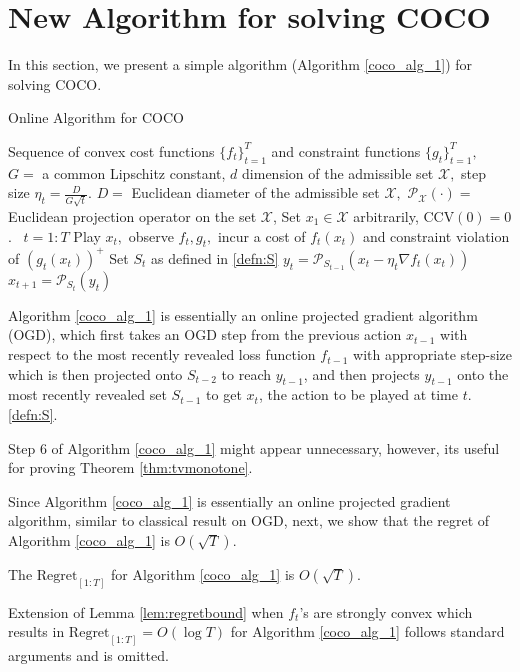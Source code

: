 \section{New Algorithm for solving COCO}
In this section, we present a simple algorithm (Algorithm \ref{coco_alg_1}) for solving COCO.
\begin{algorithm}[tb]
   \caption{Online Algorithm for COCO}
   \label{coco_alg_1}
\begin{algorithmic}[1]
    Sequence of convex cost functions $\{f_t\}_{t=1}^T$ and constraint functions $\{g_t\}_{t=1}^T,$ $G=$ a common Lipschitz constant,  $d$ dimension  of the admissible set $\mathcal{X},$ step size $\eta_t = \frac{D}{G \sqrt{t}}$. 
    $D=$ Euclidean diameter of the admissible set $\mathcal{X},$ $\mathcal{P}_\mathcal{X}(\cdot)=$ Euclidean projection operator on the set $\mathcal{X}$,       Set $ x_1 \in \mathcal{X}$ arbitrarily, $\text{CCV}(0)=0$.
    \ {$t=1:T$}
   \State \quad Play $x_t,$ observe $f_t, g_t,$ incur a cost of $f_t(x_t)$ and constraint violation of $(g_t(x_t))^+$
   \State \quad Set $S_t$ as defined in \eqref{defn:S}
    \State \quad $y_{t} =  \mathcal{P}_{S_{t-1}}\left(x_t - \eta_t \nabla f_t(x_t)\right)$
   \State \quad $x_{t+1} =  \mathcal{P}_{S_t}\left(y_t\right)$
\end{algorithmic}
\end{algorithm}
Algorithm \ref{coco_alg_1} is essentially an online projected gradient algorithm (OGD), 
which first takes an OGD step from the previous action $x_{t-1}$ with respect to the most recently revealed loss function $f_{t-1}$ with appropriate step-size which is then projected onto $S_{t-2}$ to reach $y_{t-1}$, and then projects $y_{t-1}$ onto  the most recently revealed set $S_{t-1}$ to get $x_t$,  the action to be played at time $t$.
\eqref{defn:S}. 

\begin{rem} Step 6 of Algorithm \ref{coco_alg_1} might appear unnecessary, however, its useful for proving Theorem \ref{thm:tvmonotone}.
\end{rem}

Since Algorithm \ref{coco_alg_1} is essentially an online projected gradient algorithm, similar to classical result on OGD, next, we show that the regret of Algorithm \ref{coco_alg_1} is $O(\sqrt{T})$.
\begin{lemma}\label{lem:regretbound}
The $\textrm{Regret}_{[1:T]}$ for Algorithm \ref{coco_alg_1} is $O(\sqrt{T})$.
\end{lemma}
Extension of Lemma \ref{lem:regretbound} when $f_t$'s are strongly convex which results in $\textrm{Regret}_{[1:T]}=O(\log{T})$ for Algorithm \ref{coco_alg_1} follows standard arguments \cite{Hazan} and is omitted.




